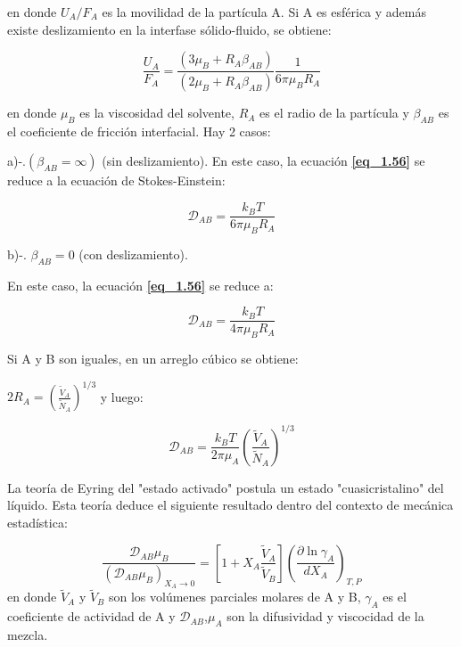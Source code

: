 en donde $U_A/F_A $ es la movilidad de la partícula A. Si A es esférica y además existe deslizamiento en la interfase sólido-fluido, se obtiene:

\begin{equation}
\frac{U_A}{F_A} = \frac{(3 \mu_B + R_A \beta_{AB})}{({2 \mu_B + R_A \beta_{AB}} )}  \frac{1}{6 \pi \mu_B R_A}\tag{1.57}\label{eq_1.57}
\end{equation}

en donde \( \mu_B \) es la viscosidad del solvente, \( R_A \) es el radio de la partícula y \( \beta_{AB} \) es el coeficiente de fricción interfacial. Hay 2 casos:

a)-.$( \beta_{AB} = \infty )$ (sin deslizamiento).
   En este caso, la ecuación \textbf{\eqref{eq_1.56}} se reduce a la ecuación de Stokes-Einstein:

   \begin{equation}
   \mathscr{D}_{AB} = \frac{k_B T}{6 \pi \mu_B R_A}\tag{1.58}\label{eq_1.58}
   \end{equation}

b)-. \( \beta_{AB} = 0 \) (con deslizamiento).  

   En este caso, la ecuación \textbf{\eqref{eq_1.56}} se reduce a:

   \begin{equation}
   \mathscr{D}_{AB} = \frac{k_B T}{4 \pi \mu_B R_A}\tag{1.59}\label{eq_1.59}
   \end{equation}

Si A y B son iguales, en un arreglo cúbico se obtiene:


$2 R_A = \left( \frac{\widetilde{V}_A}{\widetilde{N}_A} \right)^{1/3}$ y luego:

\begin{equation}
\mathscr{D}_{AB} = \frac{k_B T}{2 \pi \mu_A} \left( \frac{\widetilde{V}_A}{\widetilde{N}_A} \right)^{1/3}\tag{1.60}\label{eq_1.60}
\end{equation}

La teoría de Eyring del "estado activado" postula un estado "cuasicristalino" del líquido. Esta teoría deduce el siguiente resultado dentro del contexto de mecánica estadística:

\begin{equation}
\frac{\mathscr{D}_{AB} \mu_B}{(\mathscr{D}_{AB}\mu_B)_{X_A \to 0}} = \left[ 1 + X_A \frac{\widetilde{V}_A}{\widetilde{V}_B} \right] \left( \frac{\partial \ln \gamma_{A}}{d X_A} \right)_{T,P}\tag{1.61}\label{eq_1.61}
\end{equation}
en donde $\widetilde{V}_A$ y $\widetilde{V}_B$ son los volúmenes parciales molares de A y B, $\gamma_A$ es el coeficiente de actividad de A y $\mathscr{D}_{AB}$,$\mu_A$ son la difusividad y viscocidad de la mezcla.

